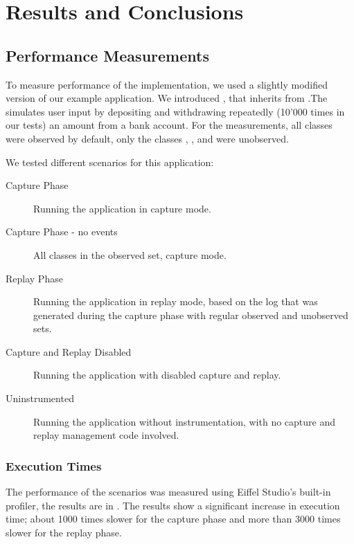 \chapter{Results and Conclusions}


\section{Performance Measurements}
To measure performance of the implementation, we used a slightly modified version of our example application. We introduced , that inherits from .The simulates user input by depositing and withdrawing repeatedly (10'000 times in our tests) an amount from a bank account. For the measurements, all classes were observed by default, only the classes , ,  and  were unobserved.

We tested different scenarios for this application:

\begin{description}
 \item [Capture Phase] Running the application in capture mode.
 \item [Capture Phase - no events] All classes in the observed set, capture mode.
 \item [Replay Phase] Running the application in replay mode, based on the log that was generated during the capture phase with regular observed and unobserved sets.
 \item [Capture and Replay Disabled] Running the application with disabled capture and replay.
 \item [Uninstrumented] Running the application without instrumentation, with no capture and replay management code involved.
\end{description}


\subsection{Execution Times}
The performance of the scenarios was measured using Eiffel Studio's built-in profiler, the results are in . The results show a significant increase in execution time; about 1000 times slower for the capture phase and more than 3000 times slower for the replay phase.

